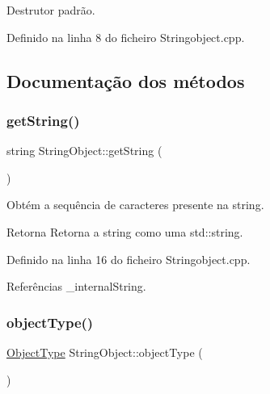 Destrutor padrão. 



Definido na linha 8 do ficheiro Stringobject.\+cpp.



\subsection{Documentação dos métodos}
\mbox{\label{classStringObject_aedd2df1630c9b291ea17407b3f626573}} 
\subsubsection{\texorpdfstring{get\+String()}{getString()}}
{\footnotesize\ttfamily string String\+Object\+::get\+String (\begin{DoxyParamCaption}{ }\end{DoxyParamCaption})}



Obtém a sequência de caracteres presente na string. 

\begin{DoxyReturn}{Retorna}
Retorna a string como uma std\+::string. 
\end{DoxyReturn}


Definido na linha 16 do ficheiro Stringobject.\+cpp.



Referências \+\_\+internal\+String.

\mbox{\label{classStringObject_a7d89db7df43b17354baf5337edd636b7}} 
\subsubsection{\texorpdfstring{object\+Type()}{objectType()}}
{\footnotesize\ttfamily \hyperlink{BasicTypes_8h_a842c5e2e69277690b064bf363c017980}{Object\+Type} String\+Object\+::object\+Type (\begin{DoxyParamCaption}{ }\end{DoxyParamCaption})\hspace{0.3cm}{\ttfamily [virtual]}}



